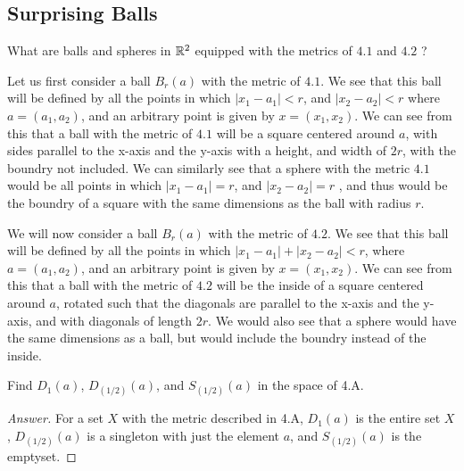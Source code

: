 \subsection{Surprising Balls}

\begin{minorEx}%
  What are balls and spheres in $\mathbb{R}^2$ equipped with the metrics
  of $4.1$ and $4.2$ ?
\end{minorEx}

Let us first consider a ball $B_r(a)$ with the metric of $4.1$. We see that this
ball will be defined by all the points in which $|x_1-a_1|<r$,
and  $|x_2-a_2|<r$ where $a=(a_1,a_2)$, and an arbitrary point is given
by $x= (x_1,x_2)$. We can see from this that a ball with the metric of
$4.1$ will be a square centered around $a$, with sides parallel to
the x-axis and the y-axis with a height, and width
of $2r$, with the boundry not included. We can similarly see that a
sphere with the metric $4.1$ would be all points in which $|x_1-a_1|=r$,
and  $|x_2-a_2|=r$ , and thus would be the boundry of a square with
the same dimensions as the ball with radius $r$.

We will now consider a ball $B_r(a)$ with the metric of $4.2$. We see
that this ball will be defined by all the points in which 
$|x_1-a_1| + |x_2-a_2|<r$, where $a=(a_1,a_2)$, and
an arbitrary point is given by $x= (x_1,x_2)$. We can see from this
that a ball with the metric of $4.2$ will be the inside of a square centered around
$a$, rotated such that the diagonals are parallel to the x-axis and
the y-axis, and with diagonals of length $2r$. We would also see that
a sphere would have the same dimensions as a ball, but would include
the boundry instead of the inside.

\begin{minorEx}%
Find $D_1(a)$, $D_(1/2)(a)$, and $S_(1/2)(a)$ in the space of 4.A.
\end{minorEx}
\begin{proof}[Answer]
For a set $X$ with the metric described in 4.A, $D_1(a)$ is the entire set $X$, $D_(1/2)(a)$ is a singleton with just the element $a$, and $S_(1/2)(a)$ is the emptyset.
\end{proof}
